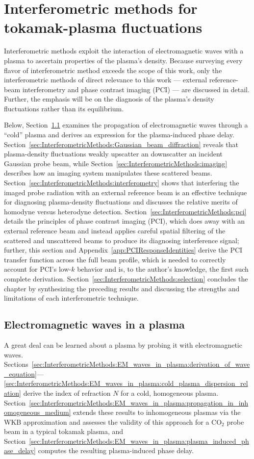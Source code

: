 \chapter{Interferometric methods for tokamak-plasma fluctuations}
Interferometric methods exploit the interaction of
electromagnetic waves with a plasma
to ascertain properties of the plasma's density.
Because surveying every flavor of interferometric method
exceeds the scope of this work,
only the interferometric methods
of direct relevance to this work ---
external reference-beam interferometry and phase contrast imaging (PCI) ---
are discussed in detail.
Further, the emphasis will be on the diagnosis of
the plasma's density fluctuations rather than its equilibrium.

Below, Section~\ref{sec:InterferometricMethods:EM_waves_in_plasma}
examines the propagation of electromagnetic waves through a ``cold'' plasma
and derives an expression for the plasma-induced phase delay.
Section~\ref{sec:InterferometricMethods:Gaussian_beam_diffraction} reveals that
plasma-density fluctuations weakly upscatter an downscatter
an incident Gaussian probe beam, while
Section~\ref{sec:InterferometricMethods:imaging} describes
how an imaging system manipulates these scattered beams.
Section~\ref{sec:InterferometricMethods:interferometry} shows that
interfering the imaged probe radiation with an external reference beam
is an effective technique for diagnosing plasma-density fluctuations and
discusses the relative merits of homodyne versus heterodyne detection.
Section~\ref{sec:InterferometricMethods:pci} details the principles of
phase contrast imaging (PCI),
which does away with an external reference beam and
instead applies careful spatial filtering
of the scattered and unscattered beams
to produce its diagnosing interference signal;
further, this section and Appendix~\ref{app:PCIResponseIdentities}
derive the PCI transfer function across the full beam profile, which
is needed to correctly account for PCI's low-$k$ behavior and is,
to the author's knowledge, the first such complete derivation.
Section~\ref{sec:InterferometricMethods:selection}
concludes the chapter by synthesizing the preceding results and
discussing the strengths and limitations of each interferometric technique.


\section{Electromagnetic waves in a plasma}
\label{sec:InterferometricMethods:EM_waves_in_plasma}
A great deal can be learned about a plasma
by probing it with electromagnetic waves.
Sections~\ref{sec:InterferometricMethods:EM_waves_in_plasma:derivation_of_wave_equation}---
\ref{sec:InterferometricMethods:EM_waves_in_plasma:cold_plasma_dispersion_relation}
derive the index of refraction $N$ for a cold, homogeneous plasma.
Section~\ref{sec:InterferometricMethods:EM_waves_in_plasma:propagation_in_inhomogeneous_medium}
extends these results to inhomogeneous plasmas via the WKB approximation and
assesses the validity of this approach for
a CO$_2$ probe beam in a typical tokamak plasma, and
Section~\ref{sec:InterferometricMethods:EM_waves_in_plasma:plasma_induced_phase_delay}
computes the resulting plasma-induced phase delay.


